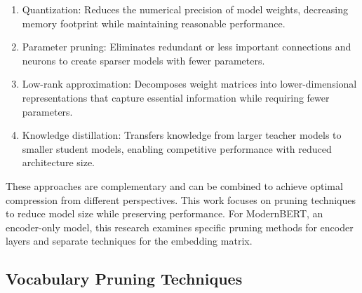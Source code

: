 \documentclass[twocolumn]{article}
\begin{document}
\begin{enumerate}
    \item Quantization: Reduces the numerical precision of model weights, decreasing memory footprint while maintaining reasonable performance.
    
    \item Parameter pruning: Eliminates redundant or less important connections and neurons to create sparser models with fewer parameters.
    
    \item Low-rank approximation: Decomposes weight matrices into lower-dimensional representations that capture essential information while requiring fewer parameters.
    
    \item Knowledge distillation: Transfers knowledge from larger teacher models to smaller student models, enabling competitive performance with reduced architecture size.
\end{enumerate}
These approaches are complementary and can be combined to achieve optimal compression from different perspectives. 
This work focuses on pruning techniques to reduce model size while preserving performance.
For ModernBERT, an encoder-only model, this research examines specific pruning methods for encoder layers and separate techniques for the embedding matrix.

\subsection{Vocabulary Pruning Techniques}
\end{document}
